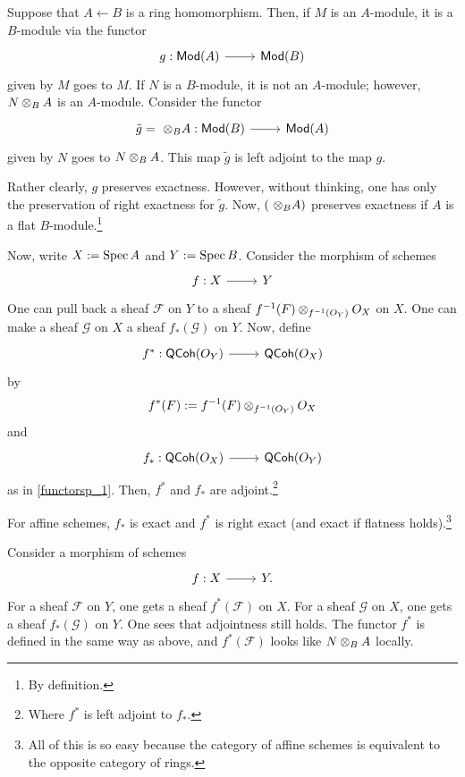 \documentclass [11 pt, oneside] {article}
\begin{document}
Suppose that $A \longleftarrow B$ is a ring homomorphism. Then, if $M$ is an $A$-module, it is a $B$-module via the functor 
\[
\begin{tikzcd}
g: \catn{Mod}(A) \ar[r]& \catn{Mod}(B)
\end{tikzcd}
\] 
given by $M$ goes to $M$. If $N$ is a $B$-module, it is not an $A$-module; however, $N\otimes_B A$ is an $A$-module. Consider the functor 
\[
\begin{tikzcd}
\tilde g = \ \tensor_B A: \catn{Mod}(B) \ar[r]& \catn{Mod}(A)
\end{tikzcd}
\]
given by $N$ goes to $N\otimes_B A$. This map $\tilde g$ is left adjoint to the map $g$. 

Rather clearly, $g$ preserves exactness. However, without thinking, one has only the preservation of right exactness for $\tilde g$. Now, $(\ \otimes_B A)$ preserves exactness if $A$ is a flat $B$-module.\footnote{By definition.}

Now, write $X :=\operatorname{Spec} A$ and $Y:=\operatorname{Spec} B$. Consider the morphism of schemes 
\[
\begin{tikzcd}
f:X\ar[r]&Y
\end{tikzcd}
\]
One can pull back a sheaf $\mathscr{F}$ on $Y$ to a sheaf $f^{-1}(\relax{F})\otimes_{f^{-1}(\relax{O}_Y)} \relax{O}_X$ on $X$. One can make a sheaf $\mathscr{G}$ on $X$ a sheaf $f_*(\mathscr{G})$ on $Y$. Now, define  
\[
\begin{tikzcd}
f^* :\catn{QCoh}(\mathscr{O}_Y)\ar[r]& \catn{QCoh}(\mathscr{O}_X)
\end{tikzcd}
\]
by
\begin{align*}
	f^*(\relax{F}) := f^{-1}(\relax{F}) \otimes_{f^{-1}(\relax{O}_Y)} \relax{O}_X
\end{align*}
and
\[
\begin{tikzcd}
f_* : \catn{QCoh}(\mathscr{O}_X)\ar[r]& \catn{QCoh}(\mathscr{O}_Y)
\end{tikzcd}
\]
as in \cref{functorsp_1}. Then, $f^*$ and $f_*$ are adjoint.\footnote{Where $f^*$ is left adjoint to $f_*$.}

For affine schemes, $f_*$ is exact and $f^*$ is right exact (and exact if flatness holds).\footnote{All of this is so easy because the category of affine schemes is equivalent to the opposite category of rings.}

Consider a morphism of schemes
\[
\begin{tikzcd}
f:X\ar[r]&Y.
\end{tikzcd}
\]
For a sheaf $\mathscr{F}$ on $Y$, one gets a sheaf $f^*(\mathscr{F})$ on $X$. For a sheaf $\mathscr{G}$ on $X$, one gets a sheaf $f_*(\mathscr{G})$ on $Y$. One sees that adjointness still holds. The functor $f^*$ is defined in the same way as above, and $f^*(\mathscr{F})$ looks like $N\otimes_B A$ locally.
\end{document}
